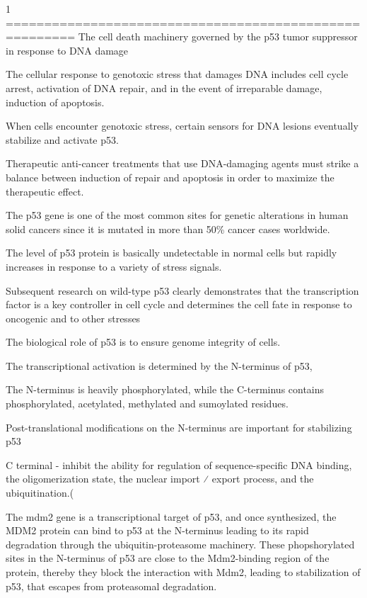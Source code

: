 1 
=======================================================
The cell death machinery governed by the p53 tumor suppressor in response to DNA damage

The cellular response to genotoxic stress that damages DNA includes cell cycle arrest, activation of DNA repair, and in the event of irreparable damage, induction of apoptosis.

 When cells encounter genotoxic stress, certain sensors for DNA lesions eventually stabilize and activate p53. 


 Therapeutic anti-cancer treatments that use DNA-damaging agents must strike a balance between induction of repair and apoptosis in order to maximize the therapeutic effect. 

The p53 gene is one of the most common sites for genetic alterations in human solid cancers since it is mutated in more than 50\% cancer cases worldwide.

The level of p53 protein is basically undetectable in normal cells but rapidly increases in response to a variety of stress signals. 

Subsequent research on wild-type p53 clearly demonstrates that the transcription factor is a key controller in cell cycle and determines the cell fate in response to oncogenic and to other stresses

The biological role of p53 is to ensure genome integrity of cells.

 The transcriptional activation is determined by the N-terminus of p53,


 The N-terminus is heavily phosphorylated, while the C-terminus contains phosphorylated, acetylated, methylated and sumoylated residues.

Post-translational modiﬁcations on the N-terminus are important for stabilizing p53 

C terminal - inhibit the ability for regulation of sequence-speciﬁc DNA binding, the oligomerization state, the nuclear import ⁄ export process, and the ubiquitination.(


The mdm2 gene is a transcriptional target of p53, and once synthesized, the MDM2 protein can bind to p53 at the N-terminus leading to its rapid degradation through the ubiquitin-proteasome machinery.
These phopshorylated sites in the N-terminus of p53 are close to the Mdm2-binding region of the protein, thereby they block the interaction with Mdm2, leading to stabilization of p53, that escapes from proteasomal degradation.




